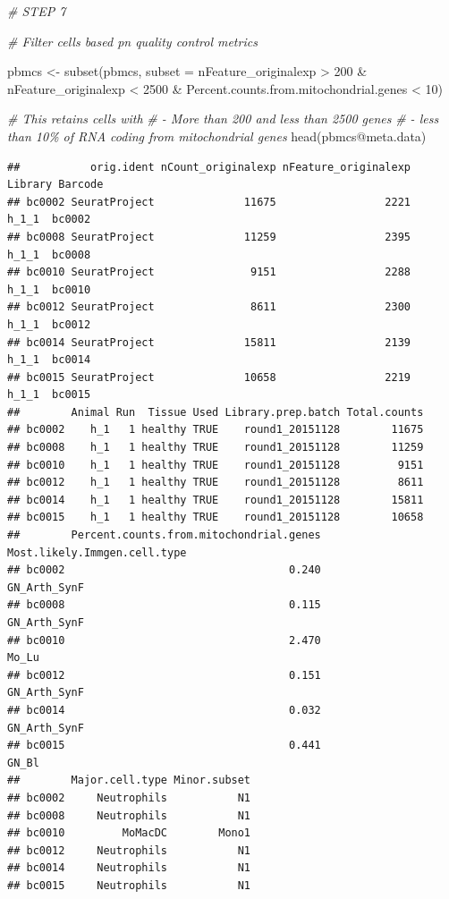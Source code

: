 \documentclass[
]{article}
\newenvironment{Shaded}{\begin{snugshade}}{\end{snugshade}}
\newcommand{\AttributeTok}[1]{\textcolor[rgb]{0.77,0.63,0.00}{#1}}
\newcommand{\CommentTok}[1]{\textcolor[rgb]{0.56,0.35,0.01}{\textit{#1}}}
\newcommand{\DecValTok}[1]{\textcolor[rgb]{0.00,0.00,0.81}{#1}}
\newcommand{\FunctionTok}[1]{\textcolor[rgb]{0.00,0.00,0.00}{#1}}
\newcommand{\NormalTok}[1]{#1}
\newcommand{\OtherTok}[1]{\textcolor[rgb]{0.56,0.35,0.01}{#1}}
\newcommand{\SpecialCharTok}[1]{\textcolor[rgb]{0.00,0.00,0.00}{#1}}
\begin{document}
\begin{Shaded}
\begin{Highlighting}[]
\CommentTok{\# STEP 7}

\CommentTok{\# Filter cells based pn quality control metrics }

\NormalTok{pbmcs }\OtherTok{\textless{}{-}} \FunctionTok{subset}\NormalTok{(pbmcs, }\AttributeTok{subset =}\NormalTok{ nFeature\_originalexp }\SpecialCharTok{\textgreater{}} \DecValTok{200} \SpecialCharTok{\&}\NormalTok{ nFeature\_originalexp }\SpecialCharTok{\textless{}} \DecValTok{2500} \SpecialCharTok{\&}\NormalTok{ Percent.counts.from.mitochondrial.genes }\SpecialCharTok{\textless{}} \DecValTok{10}\NormalTok{)}

\CommentTok{\# This retains cells with }
\CommentTok{\# {-} More than 200 and less than 2500 genes}
\CommentTok{\# {-} less than 10\% of RNA coding from mitochondrial genes}
\FunctionTok{head}\NormalTok{(pbmcs}\SpecialCharTok{@}\NormalTok{meta.data)}
\end{Highlighting}
\end{Shaded}

\begin{verbatim}
##           orig.ident nCount_originalexp nFeature_originalexp Library Barcode
## bc0002 SeuratProject              11675                 2221   h_1_1  bc0002
## bc0008 SeuratProject              11259                 2395   h_1_1  bc0008
## bc0010 SeuratProject               9151                 2288   h_1_1  bc0010
## bc0012 SeuratProject               8611                 2300   h_1_1  bc0012
## bc0014 SeuratProject              15811                 2139   h_1_1  bc0014
## bc0015 SeuratProject              10658                 2219   h_1_1  bc0015
##        Animal Run  Tissue Used Library.prep.batch Total.counts
## bc0002    h_1   1 healthy TRUE    round1_20151128        11675
## bc0008    h_1   1 healthy TRUE    round1_20151128        11259
## bc0010    h_1   1 healthy TRUE    round1_20151128         9151
## bc0012    h_1   1 healthy TRUE    round1_20151128         8611
## bc0014    h_1   1 healthy TRUE    round1_20151128        15811
## bc0015    h_1   1 healthy TRUE    round1_20151128        10658
##        Percent.counts.from.mitochondrial.genes Most.likely.Immgen.cell.type
## bc0002                                   0.240                 GN_Arth_SynF
## bc0008                                   0.115                 GN_Arth_SynF
## bc0010                                   2.470                        Mo_Lu
## bc0012                                   0.151                 GN_Arth_SynF
## bc0014                                   0.032                 GN_Arth_SynF
## bc0015                                   0.441                        GN_Bl
##        Major.cell.type Minor.subset
## bc0002     Neutrophils           N1
## bc0008     Neutrophils           N1
## bc0010         MoMacDC        Mono1
## bc0012     Neutrophils           N1
## bc0014     Neutrophils           N1
## bc0015     Neutrophils           N1
\end{verbatim}
\end{document}
